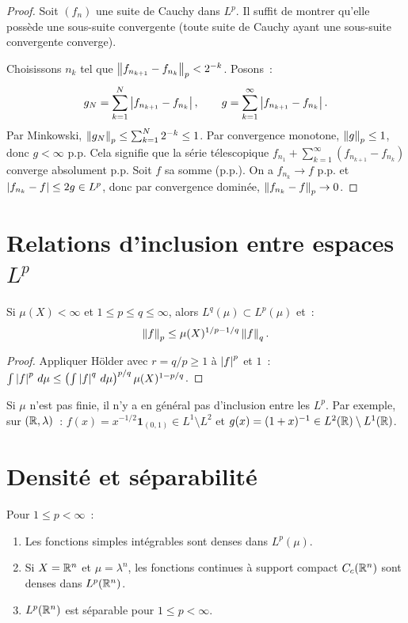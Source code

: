 \begin{proof}
Soit $(f_n)$ une suite de Cauchy dans $L^p$. Il suffit de montrer qu'elle poss\`ede
une sous-suite convergente (toute suite de Cauchy ayant une sous-suite convergente
converge).

Choisissons $n_k$ tel que $\left\| f_{n_{k+1}} - f_{n_k} \right\|_p < 2^{-k}$. Posons~:
\[
g_N = \sum_{k=1}^{N} \left| f_{n_{k+1}} - f_{n_k} \right|, \qquad
g = \sum_{k=1}^{\infty} \left| f_{n_{k+1}} - f_{n_k} \right|.
\]
Par Minkowski, $\left\| g_N \right\|_p \leq \sum_{k=1}^N 2^{-k} \leq 1$. Par convergence
monotone, $\left\| g \right\|_p \leq 1$, donc $g < \infty$ p.p. Cela signifie que la s\'erie
t\'elescopique $f_{n_1} + \sum_{k=1}^{\infty} (f_{n_{k+1}} - f_{n_k})$ converge
absolument p.p. Soit $f$ sa somme (p.p.). On a $f_{n_k} \to f$ p.p. et
$\left| f_{n_k} - f \right| \leq 2g \in L^p$, donc par convergence domin\'ee,
$\left\| f_{n_k} - f \right\|_p \to 0$.
\end{proof}

\section{Relations d'inclusion entre espaces $L^p$}

\begin{proposition}
Si $\mu(X) < \infty$ et $1 \leq p \leq q \leq \infty$, alors
$L^q(\mu) \subset L^p(\mu)$ et~:
\[
\left\| f \right\|_p \leq \mu(X)^{1/p - 1/q} \left\| f \right\|_q.
\]
\end{proposition}

\begin{proof}
Appliquer H\"older avec $r = q/p \geq 1$ \`a $\left| f \right|^p$ et $1$~:
$\int \left| f \right|^p\, d\mu \leq \left(\int \left| f \right|^q\, d\mu\right)^{p/q}
\mu(X)^{1 - p/q}$.
\end{proof}

\begin{attention}[title=\textbf{Pas d'inclusion en g\'en\'eral}]
Si $\mu$ n'est pas finie, il n'y a en g\'en\'eral pas d'inclusion entre les $L^p$.
Par exemple, sur $(\mathbb{R}, \lambda)$~: $f(x) = x^{-1/2} \mathbf{1}_{(0,1)} \in L^1
\setminus L^2$ et $g(x) = (1+x)^{-1} \in L^2(\mathbb{R}) \setminus L^1(\mathbb{R})$.
\end{attention}

\section{Densit\'e et s\'eparabilit\'e}

\begin{theoreme}
Pour $1 \leq p < \infty$~:
\begin{enumerate}
    \item Les fonctions simples int\'egrables sont denses dans $L^p(\mu)$.
    \item Si $X = \mathbb{R}^n$ et $\mu = \lambda^n$, les fonctions continues \`a support
    compact $C_c(\mathbb{R}^n)$ sont denses dans $L^p(\mathbb{R}^n)$.
    \item $L^p(\mathbb{R}^n)$ est s\'eparable pour $1 \leq p < \infty$.
\end{enumerate}
\end{theoreme}

